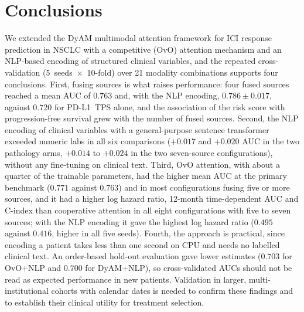 \section{Conclusions}
\label{sec:conclusion}

We extended the DyAM multimodal attention framework for ICI response prediction in NSCLC with a competitive (OvO) attention mechanism and an NLP-based
encoding of structured clinical variables, and the repeated cross-validation (5~seeds~$\times$~10-fold) over 21 modality combinations supports four conclusions.
First, fusing sources is what raises performance: four fused sources reached a mean AUC of $0.763$ and, with the NLP encoding, $0.786 \pm 0.017$, against $0.720$
for PD-L1~TPS alone, and the association of the risk score with progression-free survival grew with the number of fused sources.
Second, the NLP encoding of clinical variables with a general-purpose sentence transformer exceeded numeric labs in all six comparisons
($+0.017$ and $+0.020$ AUC in the two pathology arms, $+0.014$ to $+0.024$ in the two seven-source configurations), without any fine-tuning on clinical text.
Third, OvO attention, with about a quarter of the trainable parameters, had the higher mean AUC at the primary benchmark ($0.771$ against $0.763$) and in most configurations
fusing five or more sources, and it had a higher log hazard ratio, 12-month time-dependent AUC and C-index than cooperative attention in all eight configurations with
five to seven sources; with the NLP encoding it gave the highest log hazard ratio ($0.495$ against $0.416$, higher in all five seeds).
Fourth, the approach is practical, since encoding a patient takes less than one second on CPU and needs no labelled clinical text.
An order-based hold-out evaluation gave lower estimates ($0.703$ for OvO+NLP and $0.700$ for DyAM+NLP), so cross-validated AUCs should not be read as expected performance
in new patients.
Validation in larger, multi-institutional cohorts with calendar dates is needed to confirm these findings and to establish their clinical utility for treatment selection.
